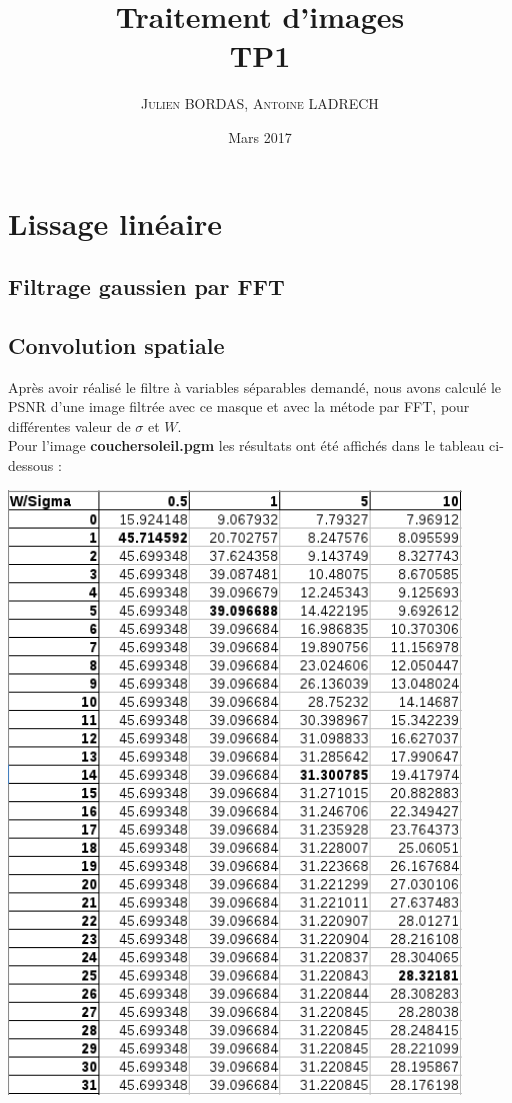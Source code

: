 \documentclass[a4,12pt]{article}
\title{\textbf{Traitement d'images \\ TP1}}
\author{
  \begin{tabular}{cc}
    \textsc{Julien BORDAS, Antoine LADRECH}
  \end{tabular}}
\date{\small Mars 2017}
\begin{document}
\maketitle

\section{Lissage linéaire}

\subsection{Filtrage gaussien par FFT}





\subsection{Convolution spatiale}

Après avoir réalisé le filtre à variables séparables demandé, nous avons calculé le PSNR d'une image filtrée avec ce masque et avec la métode par FFT, pour différentes valeur de $\sigma$ et $W$.\\

Pour l'image \textbf{couchersoleil.pgm} les résultats ont été affichés dans le tableau ci-dessous :
\begin{center}
  \includegraphics[width=12cm]{part1_2couchersoleil.png}
\end{center}
\end{document}
